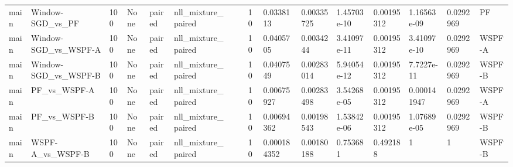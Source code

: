 \begin{tabular}{llllllllllllllll}
main & Window-SGD\_vs\_PF & 100 & None & paired & nll\_mixture\_paired &  &  & 10 & 0.0338113 & 0.00335725 & 1.45703e-10 & 0.00195312 & 1.16563e-09 & 0.0292969 & PF \\
main & Window-SGD\_vs\_WSPF-A & 100 & None & paired & nll\_mixture\_paired &  &  & 10 & 0.0405705 & 0.0034244 & 3.41097e-11 & 0.00195312 & 3.41097e-10 & 0.0292969 & WSPF-A \\
main & Window-SGD\_vs\_WSPF-B & 100 & None & paired & nll\_mixture\_paired &  &  & 10 & 0.0407549 & 0.00283014 & 5.94054e-12 & 0.00195312 & 7.7227e-11 & 0.0292969 & WSPF-B \\
main & PF\_vs\_WSPF-A & 100 & None & paired & nll\_mixture\_paired &  &  & 10 & 0.00675927 & 0.00283498 & 3.54268e-05 & 0.00195312 & 0.000141947 & 0.0292969 & WSPF-A \\
main & PF\_vs\_WSPF-B & 100 & None & paired & nll\_mixture\_paired &  &  & 10 & 0.00694362 & 0.00198543 & 1.53842e-06 & 0.00195312 & 1.07689e-05 & 0.0292969 & WSPF-B \\
main & WSPF-A\_vs\_WSPF-B & 100 & None & paired & nll\_mixture\_paired &  &  & 10 & 0.000184352 & 0.00180188 & 0.753681 & 0.492188 & 1 & 1 & WSPF-B \\
\hline
\end{tabular}
